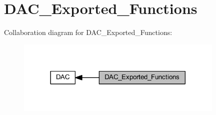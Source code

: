 \hypertarget{group___d_a_c___exported___functions}{}\section{D\+A\+C\+\_\+\+Exported\+\_\+\+Functions}
\label{group___d_a_c___exported___functions}
Collaboration diagram for D\+A\+C\+\_\+\+Exported\+\_\+\+Functions\+:
\nopagebreak
\begin{figure}[H]
\begin{center}
\leavevmode
\includegraphics[width=282pt]{group___d_a_c___exported___functions}
\end{center}
\end{figure}
